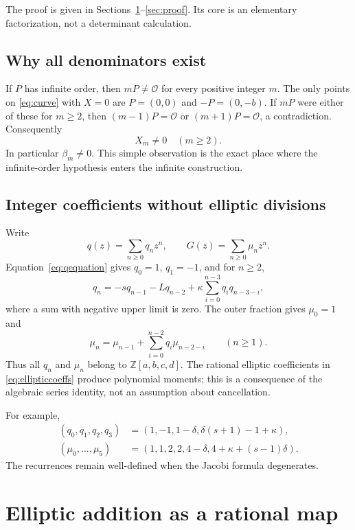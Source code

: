 \documentclass[11pt,letterpaper]{article}
\numberwithin{equation}{section}
\theoremstyle{definition}
\theoremstyle{remark}
\newcommand{\Z}{\mathbb{Z}}
\newcommand{\OO}{\mathcal{O}}
\begin{document}
The proof is given in Sections~\ref{sec:map}--\ref{sec:proof}. Its core is
an elementary factorization, not a determinant calculation.

\subsection{Why all denominators exist}
If $P$ has infinite order, then $mP\ne\OO$ for every positive integer $m$.
The only points on \eqref{eq:curve} with $X=0$ are
$P=(0,0)$ and $-P=(0,-b)$. If $mP$ were either of these for $m\ge2$,
then $(m-1)P=\OO$ or $(m+1)P=\OO$, a contradiction. Consequently
\begin{equation}\label{eq:nonzeroX}
 X_m\ne0\quad(m\ge2).
\end{equation}
In particular $\beta_m\ne0$. This simple observation is the exact place
where the infinite-order hypothesis enters the infinite construction.

\subsection{Integer coefficients without elliptic divisions}\label{subsec:recurrences}
Write
\[
 q(z)=\sum_{n\ge0}q_nz^n,\qquad
 G(z)=\sum_{n\ge0}\mu_nz^n.
\]
Equation~\eqref{eq:qequation} gives $q_0=1$, $q_1=-1$, and for $n\ge2$,
\begin{equation}\label{eq:qrec}
 q_n=-s q_{n-1}-Lq_{n-2}
      +\kappa\sum_{i=0}^{n-3}q_iq_{n-3-i},
\end{equation}
where a sum with negative upper limit is zero. The outer fraction gives
$\mu_0=1$ and
\begin{equation}\label{eq:murec}
 \mu_n=\mu_{n-1}+\sum_{i=0}^{n-2}q_i\mu_{n-2-i}\qquad(n\ge1).
\end{equation}
Thus all $q_n$ and $\mu_n$ belong to $\Z[a,b,c,d]$. The rational
elliptic coefficients in \eqref{eq:ellipticcoeffs} produce polynomial
moments; this is a consequence of the algebraic series identity, not an
assumption about cancellation.

For example,
\begin{align*}
 (q_0,q_1,q_2,q_3)&=(1,-1,1-\delta,\delta(s+1)-1+\kappa),\\
 (\mu_0,\ldots,\mu_5)&=(1,1,2,2,4-\delta,
                         4+\kappa+(s-1)\delta).
\end{align*}
The recurrences remain well-defined when the Jacobi formula degenerates.

\section{Elliptic addition as a rational map}\label{sec:map}
\end{document}
